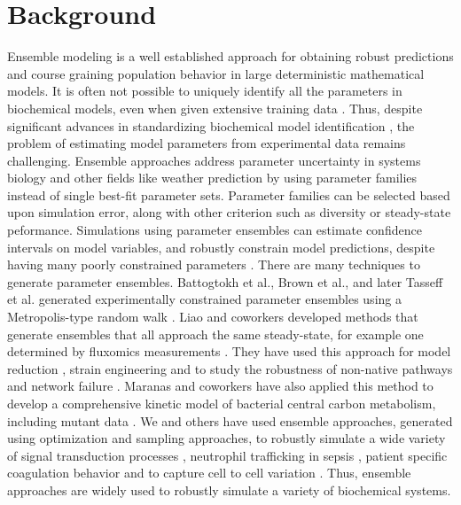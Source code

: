 \documentclass{bmcart}
\begin{document}
\section*{Background}
Ensemble modeling is a well established approach for obtaining robust predictions and course graining population behavior in large deterministic mathematical models.
It is often not possible to uniquely identify all the parameters in biochemical models, even when given extensive training data \cite{Gadkar:2005ad}.
Thus, despite significant advances in standardizing biochemical model identification \cite{Gennemark:2009on},
the problem of estimating model parameters from experimental data remains challenging.
Ensemble approaches address parameter uncertainty in systems biology and other fields like weather prediction \cite{Battogtokh:2002,Kuepfer:2007, Brown:2003,Palmer:2005}
by using parameter families instead of single best-fit parameter sets.
Parameter families can be selected based upon simulation error, along with other criterion such as diversity or steady-state peformance.
Simulations using parameter ensembles can estimate confidence intervals on model variables, and robustly constrain model predictions,
despite having many poorly constrained parameters \cite{Gutenkunst2007,Song:2009b}.
There are many techniques to generate parameter ensembles.
Battogtokh et al., Brown et al., and later Tasseff et al. generated experimentally constrained parameter ensembles using a
Metropolis-type random walk \cite{Battogtokh:2002,Brown:2003,Tasseff:2010aa,Tasseff:2011aa}.
Liao and coworkers developed methods that generate ensembles that all approach the same steady-state, for example one determined by fluxomics measurements \cite{Tran:2008aa}.
They have used this approach for model reduction \cite{Tan:2011aa}, strain engineering \cite{Contador2009221,Tan:2012aa} and to study the robustness of non-native pathways and network failure \cite{Lee:2014aa}. Maranas and coworkers have also applied this method to develop a comprehensive kinetic model of bacterial central carbon metabolism,
including mutant data \cite{Khodayari:2014aa}.
We and others have used ensemble approaches, generated using optimization and sampling approaches, to robustly simulate a wide variety of signal transduction processes \citep{Luan:2007aa,Song:2009aa,Tasseff:2010aa,Tasseff:2011aa,Nayak:2011aa}, neutrophil trafficking in sepsis \cite{Song:2012aa},
patient specific coagulation behavior \cite{Luan:2010aa} and to capture cell to cell variation \cite{Lequieu:2011aa}.
Thus, ensemble approaches are widely used to robustly simulate a variety of biochemical systems.
\end{document}
